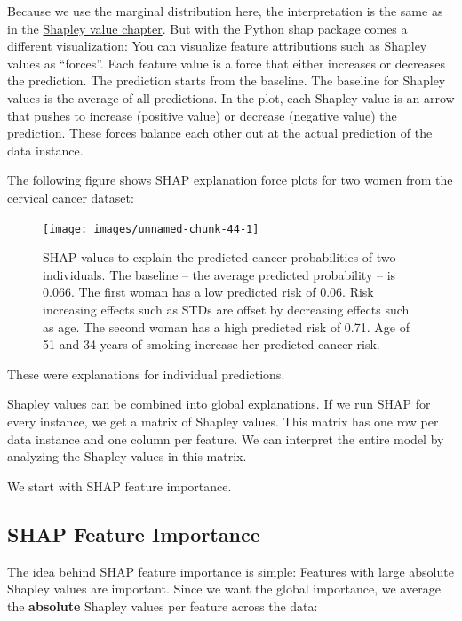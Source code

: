 \documentclass[
  11pt,
]{scrbook}
\begin{document}
Because we use the marginal distribution here, the interpretation is the same as in the \protect\hyperlink{shapley}{Shapley value chapter}.
But with the Python shap package comes a different visualization:
You can visualize feature attributions such as Shapley values as ``forces''.
Each feature value is a force that either increases or decreases the prediction.
The prediction starts from the baseline.
The baseline for Shapley values is the average of all predictions.
In the plot, each Shapley value is an arrow that pushes to increase (positive value) or decrease (negative value) the prediction.
These forces balance each other out at the actual prediction of the data instance.

The following figure shows SHAP explanation force plots for two women from the cervical cancer dataset:

\begin{figure}

{\centering \texttt{[image: images/unnamed-chunk-44-1]} 

}

\caption{SHAP values to explain the predicted cancer probabilities of two individuals. The baseline -- the average predicted probability -- is 0.066. The first woman has a low predicted risk of 0.06. Risk increasing effects such as STDs are offset by decreasing effects such as age. The second woman has a high predicted risk of 0.71. Age of 51 and 34 years of smoking increase her predicted cancer risk.}\label{fig:unnamed-chunk-44}
\end{figure}

These were explanations for individual predictions.

Shapley values can be combined into global explanations.
If we run SHAP for every instance, we get a matrix of Shapley values.
This matrix has one row per data instance and one column per feature.
We can interpret the entire model by analyzing the Shapley values in this matrix.

We start with SHAP feature importance.

\hypertarget{shap-feature-importance}{%
\subsection{SHAP Feature Importance}\label{shap-feature-importance}}

The idea behind SHAP feature importance is simple:
Features with large absolute Shapley values are important.
Since we want the global importance, we average the \textbf{absolute} Shapley values per feature across the data:
\end{document}
